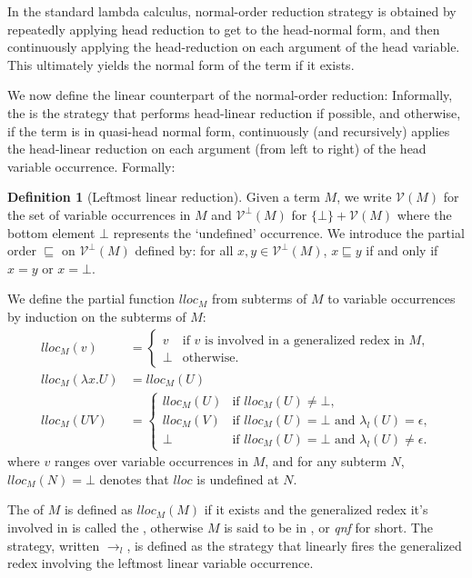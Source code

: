 \documentclass{article}
\theoremstyle{plain}
\theoremstyle{definition}
\newtheorem{definition}{Definition}[section]
\theoremstyle{remark}
\newcommand\VarSet{\mathcal{V}}
\begin{document}
In the standard lambda calculus, normal-order reduction strategy is obtained by repeatedly applying head reduction to get to the head-normal form, and then continuously applying the head-reduction on each argument of the head variable.
This ultimately yields the normal form of the term if it exists.

We now define the linear counterpart of the normal-order reduction: Informally, the  is the strategy that performs head-linear reduction if possible, and otherwise, if the term is in quasi-head normal form, continuously (and recursively) applies the head-linear reduction on each argument (from left to right) of the head variable occurrence.
Formally:

\begin{definition}[Leftmost linear reduction]
Given a term $M$, we write $\VarSet(M)$ for the set of variable occurrences in $M$
and $\VarSet^\bot(M)$ for $\{\bot \} + \VarSet(M)$ where the bottom element $\bot$ represents the `undefined' occurrence. We introduce the partial order $\sqsubseteq$ on $\VarSet^\bot(M)$ defined by: for all $x,y \in \VarSet^\bot(M)$, $x \sqsubseteq y$ if and only if $x = y$ or $x = \bot$.

We define the partial function $lloc_M$ from subterms of $M$ to variable occurrences by induction on the subterms of $M$:
\begin{align*}
lloc_M(v) &=
    \begin{cases}
    v &\mbox{if $v$ is involved in a generalized redex in $M$,} \\
    \bot & \mbox {otherwise.}
    \end{cases}  \\
lloc_M(\lambda x . U) &= lloc_M(U) \\
lloc_M(U V) &= \begin{cases}
                lloc_M(U) &\mbox{if $lloc_M(U)\neq\bot$,} \\
                lloc_M(V) &\mbox{if $lloc_M(U)=\bot$ and $\lambda_l(U) = \epsilon$,} \\
                \bot & \mbox{if $lloc_M(U)=\bot$ and $\lambda_l(U) \neq \epsilon$.}
              \end{cases}
\end{align*}
where $v$ ranges over variable occurrences in $M$,
and for any subterm $N$, $lloc_M(N) = \bot$ denotes that $lloc$ is undefined at $N$.

The  of $M$
is defined as $lloc_M(M)$ if it exists and the generalized redex it's involved in is called the , otherwise $M$ is said to be in , or \emph{qnf} for short.
The  strategy, written $\rightarrow_l$, is defined as the strategy that linearly fires the generalized redex involving the leftmost linear variable occurrence.
\end{definition}
\end{document}
